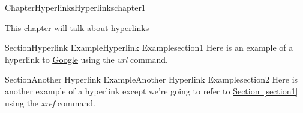 \documentclass[oneside,10pt,]{book}
\newcommand{\xreffont}{\relax}
\newcommand{\linkhilite}[1]{\underline{#1}}
\begin{document}
\raggedbottom
%
%
\typeout{************************************************}
\typeout{************************************************}
%
\begin{chapterptx}{Chapter}{Hyperlinks}{}{Hyperlinks}{}{}{chapter1}
\renewcommand*{\chaptername}{Chapter}
\begin{introduction}{}%
This chapter will talk about hyperlinks%
\end{introduction}%
%
%
\typeout{************************************************}
\typeout{************************************************}
%
\begin{sectionptx}{Section}{Hyperlink Example}{}{Hyperlink Example}{}{}{section1}
Here is an example of a hyperlink to \href{https://www.google.com}{\linkhilite{Google}} using the \emph{url} command.%
\end{sectionptx}
%
%
\typeout{************************************************}
\typeout{************************************************}
%
\begin{sectionptx}{Section}{Another Hyperlink Example}{}{Another Hyperlink Example}{}{}{section2}
Here is another example of a hyperlink except we're going to refer to \hyperref[section1]{\linkhilite{Section~{\xreffont\ref{section1}}}} using the \emph{xref} command.%
\end{sectionptx}
\end{chapterptx}
\end{document}
